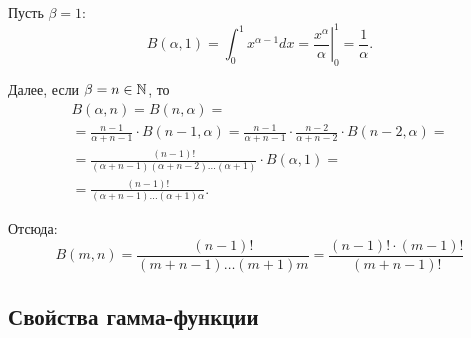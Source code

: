 \begin{enumerate}
\begin{note}
              Пусть $ \beta = 1 $:
              \[
                  B(\alpha,1) = \int_{0}^{1}x^{\alpha-1}dx = \left.\frac{x^\alpha}{\alpha}\right|_0^1 = \frac{1}{\alpha}.
              \]

              Далее, если $ \beta = n \in \mathbb{N} $, то
              \begin{multline*}
                  B(\alpha,n) = B(n,\alpha) = \\
                  = \frac{n-1}{\alpha + n-1} \cdot B(n-1,\alpha) = \frac{n-1}{\alpha + n -1} \cdot \frac{n-2}{\alpha + n - 2} \cdot B(n-2,\alpha) = \\
                  = \frac{(n-1)!}{(\alpha+n-1)(\alpha + n -2)\ldots(\alpha +1)} \cdot B(\alpha,1) = \\
                  = \frac{(n-1)!}{(\alpha + n-1)\ldots(\alpha + 1)\alpha}.
              \end{multline*}

              Отсюда:
              \[
                  \boxed{B(m,n) = \frac{(n-1)!}{(m+n-1)\ldots(m+1)m} = \frac{(n-1)!\cdot(m-1)!}{(m+n-1)!}}
              \]
          \end{note}
\end{enumerate}

\subsection{Свойства гамма-функции}

